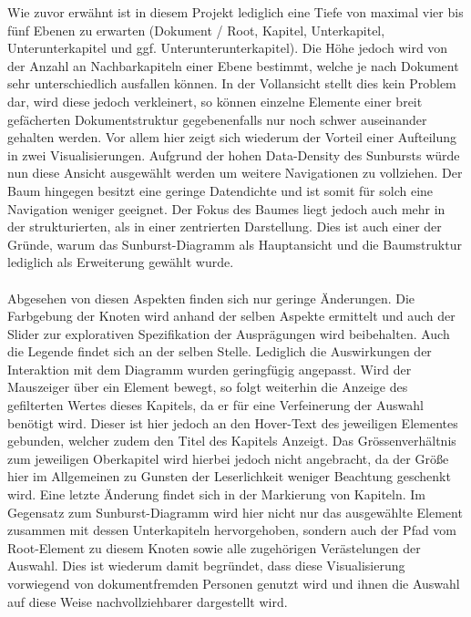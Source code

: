 Wie zuvor erw\"ahnt ist in diesem Projekt lediglich eine Tiefe von maximal vier bis f\"unf Ebenen zu erwarten (Dokument / Root, Kapitel, Unterkapitel, Unterunterkapitel und ggf. Unterunterunterkapitel). Die H\"ohe jedoch wird von der Anzahl an Nachbarkapiteln einer Ebene bestimmt, welche je nach Dokument sehr unterschiedlich ausfallen k\"onnen. In der Vollansicht stellt dies kein Problem dar, wird diese jedoch verkleinert, so k\"onnen einzelne Elemente einer breit gef\"acherten Dokumentstruktur gegebenenfalls nur noch schwer auseinander gehalten werden. Vor allem hier zeigt sich wiederum der Vorteil einer Aufteilung in zwei Visualisierungen. Aufgrund der hohen Data-Density des Sunbursts w\"urde nun diese Ansicht ausgew\"ahlt werden um weitere Navigationen zu vollziehen. Der Baum hingegen besitzt eine geringe Datendichte und ist somit f\"ur solch eine Navigation weniger geeignet. Der Fokus des Baumes liegt jedoch auch mehr in der strukturierten, als in einer zentrierten Darstellung. Dies ist auch einer der Gr\"unde, warum das Sunburst-Diagramm als Hauptansicht und die Baumstruktur lediglich als Erweiterung gew\"ahlt wurde.\\
\\
Abgesehen von diesen Aspekten finden sich nur geringe \"Anderungen. Die Farbgebung der Knoten wird anhand der selben Aspekte ermittelt und auch der Slider zur explorativen Spezifikation der Auspr\"agungen wird beibehalten. Auch die Legende findet sich an der selben Stelle. Lediglich die Auswirkungen der Interaktion mit dem Diagramm wurden geringf\"ugig angepasst. Wird der Mauszeiger \"uber ein Element bewegt, so folgt weiterhin die Anzeige des gefilterten Wertes dieses Kapitels, da er f\"ur eine Verfeinerung der Auswahl ben\"otigt wird. Dieser ist hier jedoch an den Hover-Text des jeweiligen Elementes gebunden, welcher zudem den Titel des Kapitels Anzeigt. Das Gr\"o{ss}enverh\"altnis zum jeweiligen Oberkapitel wird hierbei jedoch nicht angebracht, da der Gr\"o{\ss}e hier im Allgemeinen zu Gunsten der Leserlichkeit weniger Beachtung geschenkt wird. Eine letzte \"Anderung findet sich in der Markierung von Kapiteln. Im Gegensatz zum Sunburst-Diagramm wird hier nicht nur das ausgew\"ahlte Element zusammen mit dessen Unterkapiteln hervorgehoben, sondern auch der Pfad vom Root-Element zu diesem Knoten sowie alle zugeh\"origen Ver\"astelungen der Auswahl. Dies ist wiederum damit begr\"undet, dass diese Visualisierung vorwiegend von dokumentfremden Personen genutzt wird und ihnen die Auswahl auf diese Weise nachvollziehbarer dargestellt wird.


